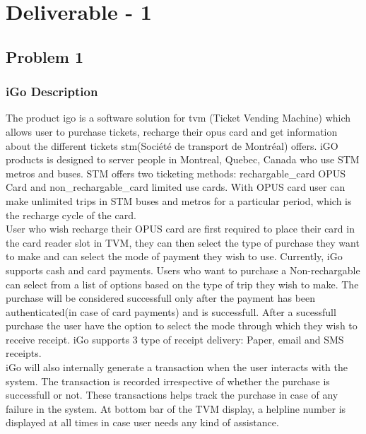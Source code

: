 \documentclass[a4paper,12pt]{report}
\begin{document}

\newpage

\tableofcontents




\chapter*{\centering Deliverable - 1}

\section{Problem 1}

\subsection{iGo Description}
The product \gls{igo} is a software solution for \gls{tvm} (Ticket Vending Machine) which allows user to purchase tickets, recharge their \gls{opus} card and get information about the different tickets \gls{stm}(Société de transport de Montréal) offers. iGO products is designed to server people in Montreal, Quebec, Canada who use STM metros and buses. STM offers two ticketing methods: \gls{rechargable_card} OPUS Card and \gls{non_rechargable_card} limited use cards. With OPUS card user can make unlimited trips in STM buses and metros for a particular period, which is the recharge cycle of the card. \\


User who wish recharge their OPUS card are first required to place their card in the card reader slot in TVM, they can then select the type of purchase they want to make and can select the mode of payment they wish to use. Currently, iGo supports cash and card payments. Users who want to purchase a Non-rechargable can select from a list of options based on the type of trip they wish to make. The purchase will be considered successfull only after the payment has been authenticated(in case of card payments) and is successfull. After a sucessfull purchase the user have the option to select the mode through which they wish to receive receipt. iGo supports 3 type of receipt delivery: Paper, email and SMS receipts. \\

iGo will also internally generate a \gls{transaction} when the user interacts with the system. The transaction is recorded irrespective of whether the purchase is successfull or not. These transactions helps track the purchase in case of any failure in the system. At bottom bar of the TVM display, a helpline number is displayed at all times in case user needs any kind of assistance.
\end{document}
